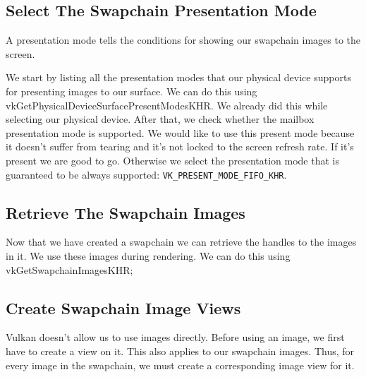 \subsection{Select The Swapchain Presentation Mode}

A presentation mode tells the conditions for showing our swapchain images to
the screen.

We start by listing all the presentation modes that our physical device supports
for presenting images to our surface.
We can do this using vkGetPhysicalDeviceSurfacePresentModesKHR.
We already did this while selecting our physical device.
After that, we check whether the mailbox presentation mode is supported.
We would like to use this present mode because it doesn't suffer from
tearing and it's not locked to the screen refresh rate.
If it's present we are good to go.
Otherwise we select the presentation mode that is guaranteed to be always supported:
\texttt{VK\_PRESENT\_MODE\_FIFO\_KHR}.

\begin{minipage}{\linewidth}{\noindent}
    
\end{minipage}

\subsection{Retrieve The Swapchain Images}

Now that we have created a swapchain we can retrieve the handles to the images
in it.
We use these images during rendering.
We can do this using vkGetSwapchainImagesKHR;

\subsection{Create Swapchain Image Views}

Vulkan doesn't allow us to use images directly.
Before using an image, we first have to create a view on it.
This also applies to our swapchain images.
Thus, for every image in the swapchain, we must create a corresponding
image view for it.

\begin{minipage}{\linewidth}{\noindent}
    
\end{minipage}

